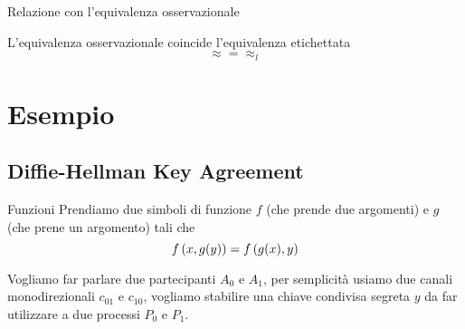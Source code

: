 \begin{frame}{Relazione con l'equivalenza osservazionale}
  \begin{myteo}
    L'equivalenza osservazionale coincide l'equivalenza etichettata
    \[ \approx = \approx _l \]
  \end{myteo}
\end{frame}

\section{Esempio}

\subsection{Diffie-Hellman Key Agreement}

\begin{frame}{Funzioni}
  Prendiamo due simboli di funzione $f$ (che prende due argomenti) e
  $g$ (che prene un argomento) tali che
  \[ f\left(x,g(y)\right) = f\left(g(x),y\right) \]
  \vfill

  Vogliamo far parlare due partecipanti $A_0$ e $A_1$, per
  semplicit\`a usiamo due canali monodirezionali $c_{01}$ e $c_{10}$,
  vogliamo stabilire una chiave condivisa segreta $y$ da far
  utilizzare a due processi $P_0$ e $P_1$.
\end{frame}

